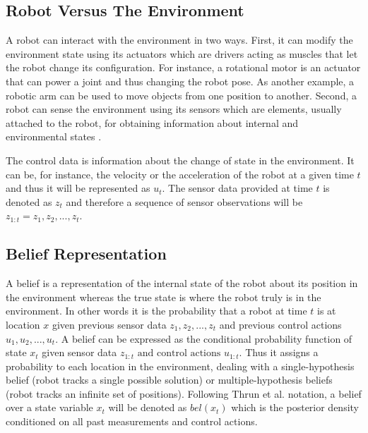 \subsection{Robot Versus The Environment}

A robot can interact with the environment in two ways. First, it can modify the environment state using its actuators which are drivers acting as muscles that let the robot change its configuration\cite{Reza:Theory-of-applied-robotics}. For instance, a rotational motor is an actuator that can power a joint and thus changing the robot pose. As another example, a robotic arm can be used to move objects from one position to another. Second, a robot can sense the environment using its sensors which are elements, usually attached to the robot, for obtaining information about internal and environmental states \cite{Reza:Theory-of-applied-robotics}\cite{Thrun:2005:PR:1121596}. 

The control data is information about the change of state in the environment\cite{Thrun:2005:PR:1121596}. It can be, for instance, the velocity or the acceleration of the robot at a given time $t$ and thus it will be represented as $u_t$.  The sensor data provided at time $t$ is denoted as $z_t$ and therefore a sequence of sensor observations will be $z_{1:t}= {z_1, z_2, ..., z_t}$.

\subsection{Belief Representation}\label{ch-2:sub:belief-representation}

A belief is a representation of the internal state of the robot about its position in the environment whereas the true state is where the robot truly is in the environment. In other words it is the probability that a robot at time $t$ is at location $x$ given previous sensor data $z_1, z_2, ..., z_t$ and previous control actions $u_1, u_2, ..., u_t$. A belief can be expressed as the conditional probability function of state $x_t$ given sensor data $z_{1:t} \text{ and control actions } u_{1:t}$. Thus it assigns a probability to each location in the environment, dealing with a single-hypothesis belief (robot tracks a single possible solution) or multiple-hypothesis beliefs (robot tracks an infinite set of positions)\cite{Siegwart:intro-autonumous-robots}. Following Thrun et al. notation, a belief over a state variable $x_t$ will be denoted as $bel(x_t)$ which is the posterior density conditioned on all past measurements and control actions.

